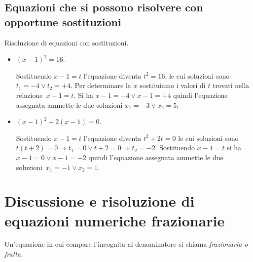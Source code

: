 \subsection{Equazioni che si possono risolvere con opportune sostituzioni}

\begin{exrig}
\begin{esempio}
Risoluzione di equazioni con sostituzioni.
\begin{itemize}
\item $( x - 1 )^{2} = 16$.

Sostituendo $x - 1 = t$ l'equazione diventa $t^{2} = 16$, le cui soluzioni sono $t_{1} = - 4 \vee t_{2} = + 4$. Per determinare la $x$ sostituiamo i valori di $t$ trovati nella relazione~$x - 1 = t$. Si ha $x - 1 = - 4 \vee x - 1 = + 4$ quindi l'equazione assegnata ammette le due soluzioni
$x_{1} = - 3 \vee x_{2} = 5$;
\item $( x - 1 )^{2} + 2 ( x - 1 ) = 0$.

Sostituendo $x - 1 = t$ l'equazione diventa $t^{2} + 2t = 0$ le cui soluzioni sono $t ( t + 2 ) = 0 \Rightarrow t_{1} = 0 \vee t + 2 = 0 \Rightarrow t_{2} = - 2$. Sostituendo $x - 1 = t$ si ha $x - 1 = 0 \vee x - 1 = - 2$ quindi l'equazione assegnata ammette le due soluzioni~$x_{1} = - 1 \vee x_{2} = 1$.
\end{itemize}
\end{esempio}
\end{exrig}
\vspazio\ovalbox{\risolvii \ref{ese:3.33}, \ref{ese:3.34}, \ref{ese:3.35}}
\pagebreak
\section{Discussione e risoluzione di equazioni numeriche frazionarie}

Un'equazione in cui compare l'incognita al denominatore si chiama \emph{frazionaria o fratta.}

